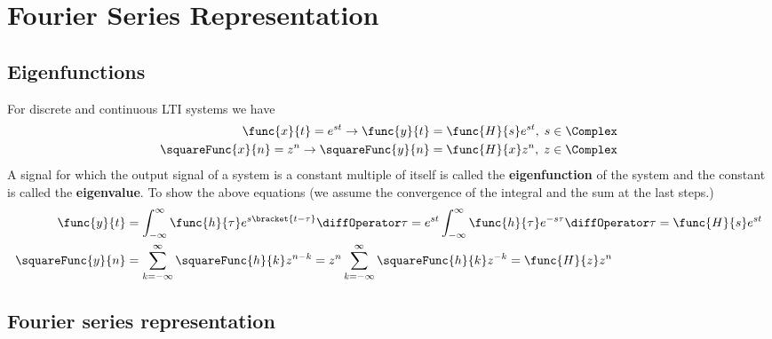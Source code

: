 \chapter{Fourier Series Representation}
\section{Eigenfunctions}
For discrete and continuous LTI systems we have 
\begin{align*}
    \func{x}{t} = e^{st} \to \func{y}{t} = \func{H}{s} e^{st}, \; s \in \Complex \\
    \squareFunc{x}{n} = z^n \to \squareFunc{y}{n} = \func{H}{x} z^n, \; z \in \Complex
\end{align*}
A signal for which the output signal of a system is a constant multiple of itself is called the \textbf{eigenfunction} of the system and the constant is called the \textbf{eigenvalue}. To show the above equations (we assume the convergence of the integral and the sum at the last steps.)
\begin{align*}
    \func{y}{t} &= \int_{-\infty}^{\infty} \func{h}{\tau} e^{s \bracket{t - \tau}} \diffOperator \tau = e^{st}  \int_{-\infty}^{\infty} \func{h}{\tau} e^{-s\tau} \diffOperator \tau = \func{H}{s} e^{st}\\
    \squareFunc{y}{n} &= \sum_{k = -\infty}^{\infty} \squareFunc{h}{k} z^{n -k} = z^n \sum_{k = -\infty}^{\infty} \squareFunc{h}{k} z^{-k} = \func{H}{z} z^n
\end{align*}

\section{Fourier series representation}
